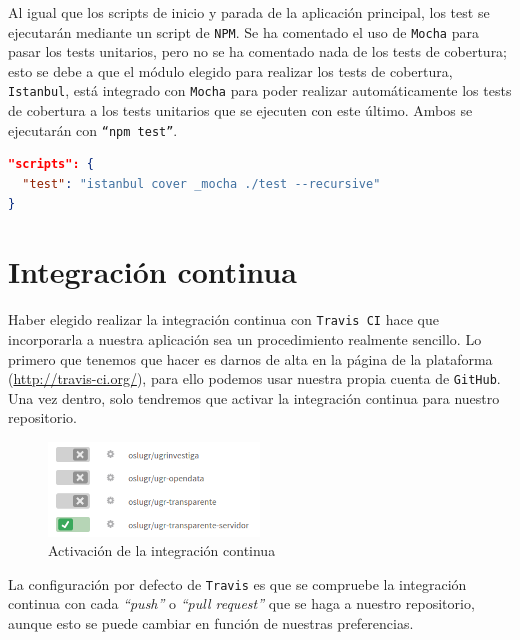 Al igual que los scripts de inicio y parada de la aplicación principal, los test se ejecutarán mediante un script de {\tt NPM}. Se ha comentado el uso de {\tt Mocha} para pasar los tests unitarios, pero no se ha comentado nada de los tests de cobertura; esto se debe a que el módulo elegido para realizar los tests de cobertura, {\tt Istanbul}, está integrado con {\tt Mocha} para poder realizar automáticamente los tests de cobertura a los tests unitarios que se ejecuten con este último. Ambos se ejecutarán con {\tt ``npm test''}.

\newpage
\begin{lstlisting}[language=json,caption={Scripts de test},label={lst:test}]
"scripts": {
  "test": "istanbul cover _mocha ./test --recursive"
}
\end{lstlisting}

\section{Integración continua}

Haber elegido realizar la integración continua con {\tt Travis CI} hace que incorporarla a nuestra aplicación sea un procedimiento realmente sencillo. Lo primero que tenemos que hacer es darnos de alta en la página de la plataforma (\url{http://travis-ci.org/}), para ello podemos usar nuestra propia cuenta de {\tt GitHub}. Una vez dentro, solo tendremos que activar la integración continua para nuestro repositorio.

\begin{figure}[!ht]
	\begin{center}
		\includegraphics[width=0.5\textwidth]{../images/activar_travis.png}
		\caption{Activación de la integración continua}
		\label{fig:activar_travis}
	\end{center}
\end{figure}

La configuración por defecto de {\tt Travis} es que se compruebe la integración continua con cada \textit{``push''} o \textit{``pull request''} que se haga a nuestro repositorio, aunque esto se puede cambiar en función de nuestras preferencias.

